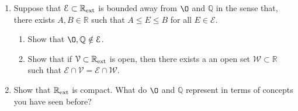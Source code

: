 \documentclass[11pt]{article}
\newcommand{\bbQ}{\mathbb{Q}}
\newcommand{\bbR}{\mathbb{R}}
\renewcommand{\emptyset}{\O}
\renewcommand{\_}[1]{\underline{ #1 }}
\theoremstyle{definition}
\numberwithin{equation}{subsection}
\begin{document}
\begin{enumerate}
\begin{enumerate}
\item
	Suppose that $\mathcal{E} \subset \bbR_{\rm ext}$ is bounded away from $\emptyset$ and $\bbQ$ in the sense that, there exists $A, B \in \bbR$ such that $A \leq E \leq B$ for all $E \in \mathcal{E}$.
	\begin{enumerate}
		\item Show that $\emptyset, \bbQ\notin \mathcal{E}$.
		\item Show that if $\mathcal{V} \subset \bbR_{\rm ext}$ is open, then there exists a an open set $\mathcal{W} \subset \bbR$ such that $\mathcal{E} \cap \mathcal{V} =\mathcal{E} \cap \mathcal{W}$.
	\end{enumerate}


\item
Show that $\bbR_{\rm ext}$ is compact.
What do $\emptyset$ and $\bbQ$ represent in terms of concepts you have seen before?
\end{enumerate}


\end{enumerate}
\end{document}
